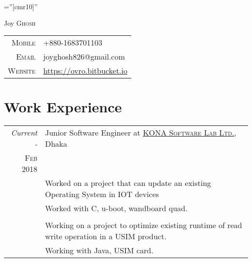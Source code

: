 \documentclass[a4paper,10pt]{article}
\begin{document}

\pagestyle{empty} %

\font\fb=''[cmr10]'' %

\par{\centering
    {\Huge Joy \textsc{Ghosh}
  }\bigskip\par}


\begin{tabular}{rl}
    \textsc{Mobile}     & +880-1683701103\\
    \textsc{Email}     & joyghosh826@gmail.com \\
    \textsc{Website}     & \href{https://ovro.bitbucket.io/}{https://ovro.bitbucket.io}
\end{tabular}

\section{Work Experience}
\begin{tabular}{r|p{11cm}}
 \emph{Current -} & Junior Software Engineer at \href{http://www.konai.com}{\textsc{KONA Software Lab Ltd.}}, Dhaka \\
 \textsc{Feb 2018} & \\
 & Worked on a project that can update an existing Operating System in IOT devices \\ 
 & Worked with C, u-boot, wandboard quad. \\
& \\
& Working on a project to optimize existing runtime of read write \mbox{operation} in a USIM product. \\
& Working with Java, USIM card.

\end{tabular}
\end{document}
